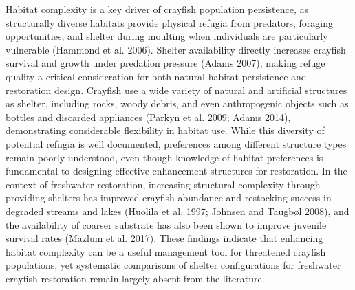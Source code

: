 \documentclass[
  12pt,
  a4paper,
  oneside]{scrbook}
\begin{document}
Habitat complexity is a key driver of crayfish population persistence,
as structurally diverse habitats provide physical refugia from
predators, foraging opportunities, and shelter during moulting when
individuals are particularly vulnerable (Hammond et al. 2006). Shelter
availability directly increases crayfish survival and growth under
predation pressure (Adams 2007), making refuge quality a critical
consideration for both natural habitat persistence and restoration
design. Crayfish use a wide variety of natural and artificial structures
as shelter, including rocks, woody debris, and even anthropogenic
objects such as bottles and discarded appliances (Parkyn et al. 2009;
Adams 2014), demonstrating considerable flexibility in habitat use.
While this diversity of potential refugia is well documented,
preferences among different structure types remain poorly understood,
even though knowledge of habitat preferences is fundamental to designing
effective enhancement structures for restoration. In the context of
freshwater restoration, increasing structural complexity through
providing shelters has improved crayfish abundance and restocking
success in degraded streams and lakes (Huolila et al. 1997; Johnsen and
Taugbøl 2008), and the availability of coarser substrate has also been
shown to improve juvenile survival rates (Mazlum et al. 2017). These
findings indicate that enhancing habitat complexity can be a useful
management tool for threatened crayfish populations, yet systematic
comparisons of shelter configurations for freshwater crayfish
restoration remain largely absent from the literature.
\end{document}
